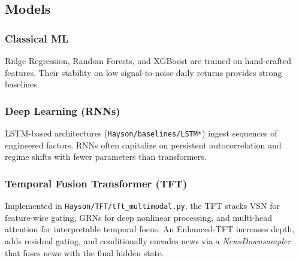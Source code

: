 \documentclass[11pt]{article}
\begin{document}
\subsection{Models}
\subsubsection*{Classical ML}
Ridge Regression, Random Forests, and XGBoost are trained on hand-crafted features. Their stability on low signal-to-noise daily returns provides strong baselines.

\subsubsection*{Deep Learning (RNNs)}
LSTM-based architectures (\texttt{Hayson/baselines/LSTM*}) ingest sequences of engineered factors. RNNs often capitalize on persistent autocorrelation and regime shifts with fewer parameters than transformers.

\subsubsection*{Temporal Fusion Transformer (TFT)}
Implemented in \texttt{Hayson/TFT/tft\_multimodal.py}, the TFT stacks VSN for feature-wise gating, GRNs for deep nonlinear processing, and multi-head attention for interpretable temporal focus. An Enhanced-TFT increases depth, adds residual gating, and conditionally encodes news via a \emph{NewsDownsampler} that fuses news with the final hidden state.
\end{document}
